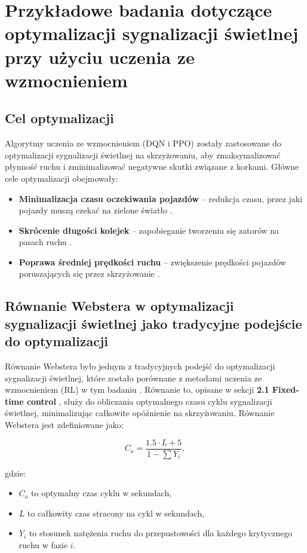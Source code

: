 \documentclass[12pt, a4paper]{article} %
\begin{document}
    \section{Przykładowe badania dotyczące optymalizacji sygnalizacji świetlnej przy użyciu uczenia ze wzmocnieniem}

    \subsection{Cel optymalizacji}
    Algorytmy uczenia ze wzmocnieniem (DQN i PPO) zostały zastosowane do optymalizacji sygnalizacji świetlnej na
    skrzyżowaniu, aby zmaksymalizować płynność ruchu i zminimalizować negatywne skutki związane z korkami. Główne cele
    optymalizacji obejmowały:

    \begin{itemize}
        \item \textbf{Minimalizacja czasu oczekiwania pojazdów}
        – redukcja czasu, przez jaki pojazdy muszą czekać na zielone światło \cite{Louw2022}.
        \item \textbf{Skrócenie długości kolejek} – zapobieganie tworzeniu się zatorów na pasach ruchu \cite{Louw2022}.
        \item \textbf{Poprawa średniej prędkości ruchu}
        – zwiększenie prędkości pojazdów poruszających się przez skrzyżowanie \cite{Louw2022}.
    \end{itemize}

    \subsection{Równanie Webstera w optymalizacji sygnalizacji świetlnej jako tradycyjne podejście do optymalizacji}

    Równanie Webstera było jednym z tradycyjnych podejść do optymalizacji sygnalizacji świetlnej, które zostało
    porównane z metodami uczenia ze wzmocnieniem (RL) w tym badaniu \cite{Webster1958}. Równanie to, opisane w sekcji
    \textbf{2.1 Fixed-time control}
    , służy do obliczania optymalnego czasu cyklu sygnalizacji świetlnej, minimalizując całkowite opóźnienie na
    skrzyżowaniu. Równanie Webstera jest zdefiniowane jako:

    \[
        C_{o} = \frac{1.5 \cdot L + 5}{1 - \sum Y_{i}},
    \]

    gdzie:
    \begin{itemize}
        \item \( C_{o} \) to optymalny czas cyklu w sekundach,
        \item \( L \) to całkowity czas stracony na cykl w sekundach,
        \item \( Y_{i} \) to stosunek natężenia ruchu do przepustowości dla każdego krytycznego ruchu w fazie \( i \).
    \end{itemize}
\end{document}
